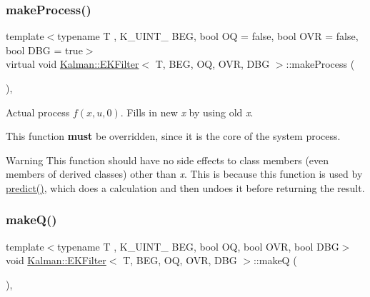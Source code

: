 \subsubsection{\texorpdfstring{make\+Process()}{makeProcess()}}
{\footnotesize\ttfamily template$<$typename T , K\+\_\+\+U\+I\+N\+T\+\_ B\+EG, bool OQ = false, bool O\+VR = false, bool D\+BG = true$>$ \\
virtual void \mbox{\hyperlink{classKalman_1_1EKFilter}{Kalman\+::\+E\+K\+Filter}}$<$ T, B\+EG, OQ, O\+VR, D\+BG $>$\+::make\+Process (\begin{DoxyParamCaption}{ }\end{DoxyParamCaption})\hspace{0.3cm}{\ttfamily [protected]}, {}}



Actual process $ f(x, u, 0) $. Fills in new {\itshape x} by using old {\itshape x}. 

This function {\bfseries must} be overridden, since it is the core of the system process. \begin{DoxyWarning}{Warning}
This function should have no side effects to class members (even members of derived classes) other than {\itshape x}. This is because this function is used by {\ttfamily \mbox{\hyperlink{classKalman_1_1EKFilter_a5f50329514f21971663ae6d4a26a1bb6}{predict()}}}, which does a calculation and then undoes it before returning the result. 
\end{DoxyWarning}
\mbox{\label{classKalman_1_1EKFilter_ab9765c4cbe0f67a1aa82ddfbc8173877}} 
\subsubsection{\texorpdfstring{make\+Q()}{makeQ()}}
{\footnotesize\ttfamily template$<$typename T , K\+\_\+\+U\+I\+N\+T\+\_ B\+EG, bool OQ, bool O\+VR, bool D\+BG$>$ \\
void \mbox{\hyperlink{classKalman_1_1EKFilter}{Kalman\+::\+E\+K\+Filter}}$<$ T, B\+EG, OQ, O\+VR, D\+BG $>$\+::makeQ (\begin{DoxyParamCaption}{ }\end{DoxyParamCaption})\hspace{0.3cm}{\ttfamily [protected]}, {\ttfamily [virtual]}}



